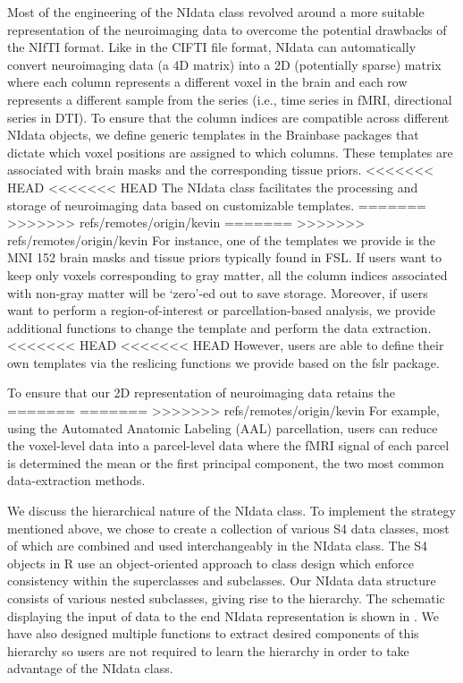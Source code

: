 \documentclass{nature}
\begin{document}
Most of the engineering of the NIdata class revolved around a more suitable
representation of the neuroimaging data to overcome the potential
drawbacks of the NIfTI format. Like in the CIFTI file
format\cite{Glasser2013The},
NIdata can automatically convert neuroimaging data (a 4D matrix)
into a 2D (potentially sparse) matrix where each
column represents a different voxel
in the brain and each row represents
a different sample from the series (i.e., time series in fMRI, directional
series in DTI). To ensure that the column indices are
compatible across different NIdata objects, we define generic templates in the
Brainbase packages that dictate which voxel positions are assigned to which
columns.
These templates are associated with brain masks and the corresponding tissue
priors. 
<<<<<<< HEAD
<<<<<<< HEAD
The NIdata class facilitates the processing
and storage of neuroimaging data based on customizable
templates.
=======
>>>>>>> refs/remotes/origin/kevin
=======
>>>>>>> refs/remotes/origin/kevin
For instance, one of the templates we provide is the MNI 152 brain masks and
tissue priors typically found in FSL.
If users want to keep only voxels corresponding to gray matter, all the column
indices associated with non-gray matter will be `zero'-ed out to save storage.
Moreover, if users want to perform a
region-of-interest or parcellation-based analysis, we provide
additional functions to change the template and perform the data extraction.
<<<<<<< HEAD
<<<<<<< HEAD
However, users are able to define their own templates via the reslicing functions
we provide based on the fslr package. %

To ensure that our 2D representation of neuroimaging data retains the
=======
=======
>>>>>>> refs/remotes/origin/kevin
For example, using the Automated Anatomic Labeling (AAL) parcellation\cite{tzourio2002automated},
users can reduce the voxel-level data into a parcel-level data where the fMRI
signal of each parcel is determined the mean or the first principal component, the two most
common data-extraction methods.

We discuss the hierarchical nature of the NIdata class. To implement the strategy mentioned
above, we chose to create a collection of various S4 data classes, most of which are combined and used
interchangeably in the NIdata class. The S4 objects in R use an object-oriented approach to class design
which enforce consistency within the superclasses and subclasses. Our NIdata data structure consists of
various nested subclasses, giving rise to the hierarchy. 
The
schematic displaying the input of data to the end NIdata representation
is shown in . We have also designed multiple functions to extract
desired components of this hierarchy so users are not required to learn the hierarchy in order to
take advantage of the NIdata class.
\end{document}
